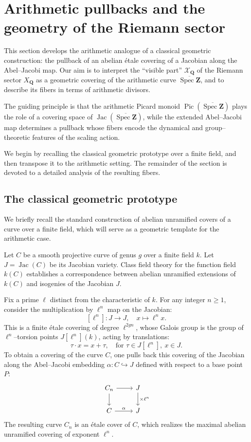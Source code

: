 \documentclass[11pt,a4paper]{article}
\newcommand{\Q}{\mathbf{Q}}
\newcommand{\Z}{\mathbf{Z}}
\def\spzb{\overline{\Spec \Z}}
\newcommand{\Spec}{\operatorname{Spec}}
\def\Pic{\operatorname{Pic}}
\def\Jac{\operatorname{Jac}}
\theoremstyle{plain}
\theoremstyle{definition} %
\begin{document}


\section{Arithmetic pullbacks and the geometry of the Riemann sector}\label{sectpullback}

This section develops the arithmetic analogue of a classical geometric construction:
the pullback of an abelian étale covering of a Jacobian along the Abel--Jacobi map.
Our aim is to interpret the ``visible part'' $\mathcal X_\Q$ of the Riemann sector $X_\Q$ as a geometric covering of the
arithmetic curve $\spzb$, and to describe its fibers in terms of arithmetic divisors.

The guiding principle is that the arithmetic Picard monoid $\Pic(\spzb)$ plays the
role of a  covering space of $\Jac(\spzb)$, while the extended Abel--Jacobi map determines
a pullback whose fibers encode the dynamical and group--theoretic features of the
scaling action.  

We begin by recalling the classical geometric prototype over a finite
field, and then transpose it to the arithmetic setting.  The remainder of the section
is devoted to a detailed analysis of the resulting fibers.



\subsection{The classical geometric prototype}

We briefly recall the standard construction of abelian unramified covers of a curve
over a finite field, which will serve as a geometric template for the arithmetic case.\vspace{.03in}

Let $C$ be a smooth projective curve of genus $g$ over a finite field $k$. Let $J = \operatorname{Jac}(C)$ be its Jacobian variety.
Class field theory for the function field $k(C)$ establishes a correspondence between abelian unramified extensions of $k(C)$ and isogenies of the Jacobian $J$.

Fix a prime $\ell$ distinct from the characteristic of $k$. For any integer $n \ge 1$, consider the multiplication by $\ell^n$ map on the Jacobian:
\[
[\ell^n]: J \longrightarrow J, \quad x \longmapsto \ell^n x.
\]
This is a finite étale covering of degree $\ell^{2gn}$, whose Galois group is the group
of $\ell^n$--torsion points $J[\ell^n](k)$, acting by translations:
\[
\tau \cdot x = x + \tau, \quad \text{for } \tau \in J[\ell^n],~ x \in J.
\]
To obtain a covering of the curve $C$, one pulls back this covering of the Jacobian
along the Abel--Jacobi embedding $\alpha : C \hookrightarrow J$ defined with respect
to a base point $P$:
\[
\begin{tikzcd}
C_n \arrow[r] \arrow[d] & J \arrow[d, "{\times \ell^n}"] \\
C \arrow[r, "\alpha"] & J
\end{tikzcd}
\]
The resulting curve $C_n$ is an étale cover of $C$, which realizes the maximal abelian
unramified covering of exponent $\ell^n$.
\end{document}
